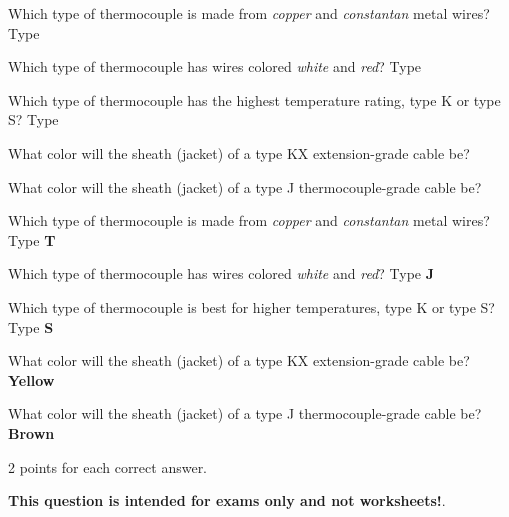 

Which type of thermocouple is made from {\it copper} and {\it constantan} metal wires?  Type \underbar{\hskip 50pt}

\vskip 10pt

Which type of thermocouple has wires colored {\it white} and {\it red}?  Type \underbar{\hskip 50pt}

\vskip 10pt

Which type of thermocouple has the highest temperature rating, type K or type S?  Type \underbar{\hskip 50pt}

\vskip 10pt

What color will the sheath (jacket) of a type KX extension-grade cable be? \underbar{\hskip 50pt}

\vskip 10pt

What color will the sheath (jacket) of a type J thermocouple-grade cable be? \underbar{\hskip 50pt}







Which type of thermocouple is made from {\it copper} and {\it constantan} metal wires?  Type {\bf T}

\vskip 10pt

Which type of thermocouple has wires colored {\it white} and {\it red}?  Type {\bf J}

\vskip 10pt

Which type of thermocouple is best for higher temperatures, type K or type S?  Type {\bf S}

\vskip 10pt

What color will the sheath (jacket) of a type KX extension-grade cable be? {\bf Yellow}

\vskip 10pt

What color will the sheath (jacket) of a type J thermocouple-grade cable be? {\bf Brown}

\vskip 10pt

2 points for each correct answer.







{\bf This question is intended for exams only and not worksheets!}.




